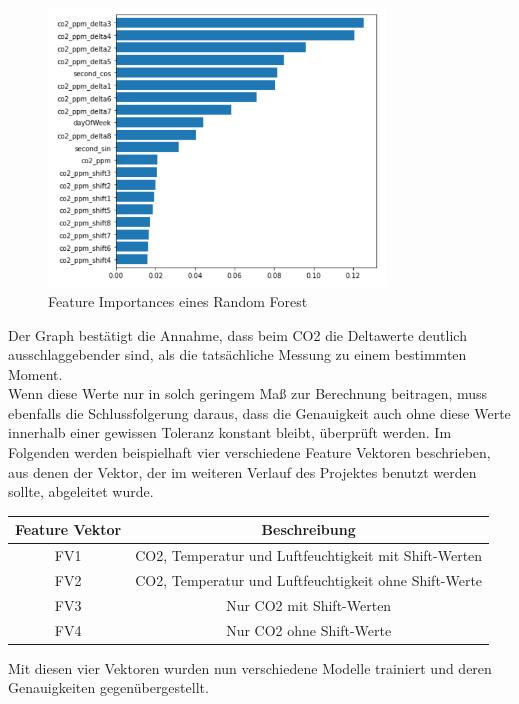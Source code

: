 \begin{figure}[h]
    \centering
    \includegraphics[width=0.8\textwidth]{pic/feature_importances_better.png}
    \caption{Feature Importances eines Random Forest}
    \label{fig:FIB}
\end{figure}

Der Graph bestätigt die Annahme, dass beim CO2 die Deltawerte deutlich ausschlaggebender sind, als die 
tatsächliche Messung zu einem bestimmten Moment. \\

Wenn diese Werte nur in solch geringem Maß zur Berechnung beitragen, muss ebenfalls die Schlussfolgerung daraus, 
dass die Genauigkeit auch ohne diese Werte innerhalb einer gewissen Toleranz konstant bleibt, überprüft werden.
\newpage
Im Folgenden werden beispielhaft vier verschiedene Feature Vektoren beschrieben, aus denen der Vektor, der im 
weiteren Verlauf des Projektes benutzt werden sollte, abgeleitet wurde.
\begin{center}
    \begin{tabular}{ |c||c| } 
     \hline
     Feature Vektor & Beschreibung \\ 
     \hline\hline
     FV1 & CO2, Temperatur und Luftfeuchtigkeit mit Shift-Werten\\ 
     FV2 & CO2, Temperatur und Luftfeuchtigkeit ohne Shift-Werte \\ 
     FV3 & Nur CO2 mit Shift-Werten\\ 
     FV4 & Nur CO2 ohne Shift-Werte \\
     \hline
    \end{tabular}
\end{center}

Mit diesen vier Vektoren wurden nun verschiedene Modelle trainiert und deren Genauigkeiten gegenübergestellt.

